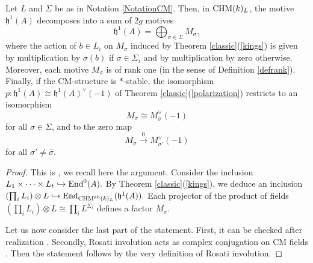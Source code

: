 \begin{prop}
\notready\label{decomposition}
Let $L$ and   $\Sigma$ be as in Notation  \ref{NotationCM}. Then, in $\mathrm{CHM} (k)_{L}$, the motive $\mathfrak{h}^1(A)$ decomposes into a sum of $2g$ motives
\[\mathfrak{h}^1(A) =\bigoplus_{\sigma \in \Sigma} M_\sigma,\]
where the action of $b\in L_i$ on $M_\sigma$ induced by Theorem \ref{classic}(\ref{kings}) is given by multiplication by $\sigma(b)$ if $\sigma \in \Sigma_i$ and by multiplication by zero otherwise.  Moreover, each motive $ M_\sigma$ is of rank one (in the sense of Definition \ref{defrank}). Finally, if the CM-structure is $*$-stable, the isomorphism $p:  \mathfrak{h}^1(A)\cong\mathfrak{h}^1(A)^{\vee}(-1)$ of Theorem \ref{classic}(\ref{polarization}) restricts to an isomorphism \[M_\sigma\cong M_{\bar{\sigma}}^\vee(-1)\] for all $\sigma\in \Sigma$, and to the zero map
\[ M_\sigma \stackrel{0}{\longrightarrow} M_{\sigma'}^\vee(-1) \]
for all $\sigma'\neq {\bar{\sigma}}$.
\end{prop}
\begin{proof}
This is \cite[Corollary 3.2]{Ascona}, we recall here the argument. Consider the inclusion $L_1\times \cdots\times L_t  \hookrightarrow  \textnormal{End}^0(A).$ By Theorem \ref{classic}(\ref{kings}), we deduce an inclusion $(\prod_i L_i)\otimes L  \hookrightarrow  \textnormal{End}_{\mathrm{CHM}^{\mathrm{ab}}(k)_{L}}(\mathfrak{h}^1(A)).$ Each projector of the product of fields $(\prod_i L_i)\otimes L \cong \prod_i L^{\Sigma_i}$ defines a factor $M_{\sigma}.$

Let us now consider the last part of the statement. First, it can be checked after realization   \cite[Corollary 1.12]{Ascona}. Secondly, Rosati involution acts as  complex conjugation on CM fields  \cite[pp. 211-212]{MumfordTata}. Then the statement follows by the very definition of Rosati involution.\end{proof}


